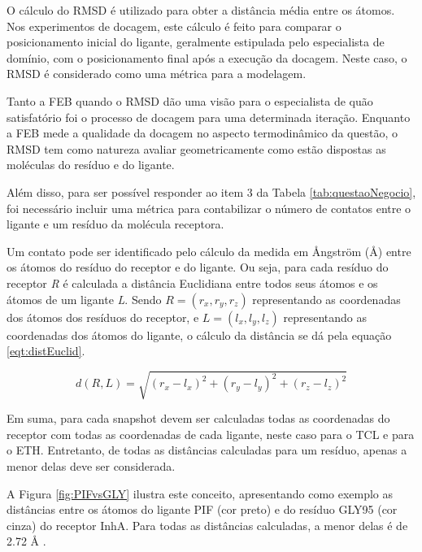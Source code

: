 O cálculo do RMSD é utilizado para obter a distância média entre os átomos. Nos experimentos de docagem, este cálculo é feito para comparar o posicionamento inicial do ligante, geralmente estipulada pelo especialista de domínio, com o posicionamento final após a execução da docagem. Neste caso, o RMSD é considerado como uma métrica para a modelagem.

Tanto a FEB quando o RMSD dão uma visão para o especialista de quão satisfatório foi o processo de docagem para uma determinada iteração. Enquanto a FEB mede a qualidade da docagem no aspecto termodinâmico da questão, o RMSD tem como natureza avaliar geometricamente como estão dispostas as moléculas do resíduo e do ligante.

Além disso, para ser possível responder ao item 3 da Tabela \ref{tab:questaoNegocio}, foi necessário incluir uma métrica para contabilizar o número de contatos entre o ligante e um resíduo da molécula receptora. 

Um contato pode ser identificado pelo cálculo da medida em {\AA}ngstr\"om ({\AA}) entre os átomos do resíduo do receptor e do ligante. Ou seja, para cada resíduo do receptor \emph{R} é calculada a distância Euclidiana entre todos seus átomos e os átomos de um ligante \emph{L}. Sendo $R=(r_{x},r_{y},r_{z})$ representando as coordenadas dos átomos dos resíduos do receptor, e $L=(l_{x},l_{y},l_{z})$ representando as coordenadas dos átomos do ligante, o cálculo da distância se dá pela equação \ref{eqt:distEuclid}.

\begin{equation}
\label{eqt:distEuclid}
	d(R,L)=\sqrt{(r_{x}-l_{x})^{2}+(r_{y}-l_{y})^{2}+(r_{z}-l_{z})^{2}}
\end{equation}

Em suma, para cada snapshot devem ser calculadas todas as coordenadas do receptor com todas as coordenadas de cada ligante, neste caso para o TCL e para o ETH. Entretanto, de todas as distâncias calculadas para um resíduo, apenas a menor delas deve ser considerada. 

A Figura \ref{fig:PIFvsGLY} ilustra este conceito, apresentando como exemplo as distâncias entre os átomos do ligante PIF (cor preto) e do resíduo GLY95 (cor cinza) do receptor InhA. Para todas as distâncias calculadas, a menor delas é de 2.72 {\AA} \cite{KARANADUNOSM09}.

